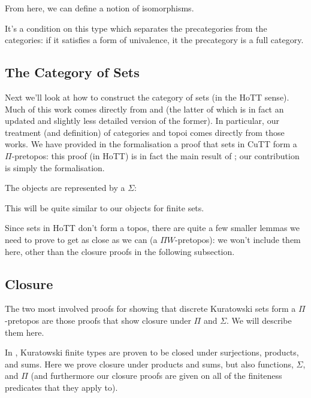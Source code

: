 From here, we can define a notion of isomorphisms.
\begin{agdalisting}
\end{agdalisting}
It's a condition on this type which separates the precategories from the
categories: if it satisfies a form of univalence, it the precategory is a full
category.
\begin{agdalisting}
\end{agdalisting}
\subsection{The Category of Sets}
Next we'll look at how to construct the category of sets (in the HoTT sense).
Much of this work comes directly from \citet{rijkeSetsHomotopyType2015} and
\citet[section 10]{hottbook} (the latter of which is in fact an updated and
slightly less detailed version of the former).
In particular, our treatment (and definition) of categories and topoi comes
directly from those works.
We have provided in the formalisation a proof that sets in CuTT form a
\(\Pi\)-pretopos: this proof (in HoTT) is in fact the main result of
\citet{rijkeSetsHomotopyType2015}; our contribution is simply the formalisation.

The objects are represented by a \(\Sigma\):
\begin{agdalisting*}
\end{agdalisting*}
This will be quite similar to our objects for finite sets.

Since sets in HoTT don't form a topos, there are quite a few smaller lemmas we
need to prove to get as close as we can (a \(\Pi W\)-pretopos): we won't include
them here, other than the closure proofs in the following subsection.
\subsection{Closure}
The two most involved proofs for showing that discrete Kuratowski sets form a
\(\Pi\)-pretopos are those proofs that show closure under \(\Pi\) and
\(\Sigma\).
We will describe them here.

In \cite[Theorem 4.21]{fruminFiniteSetsHomotopy2018}, Kuratowski finite types
are proven to be closed under surjections, products, and sums.
Here we prove closure under products and sums, but also functions, \(\Sigma\),
and \(\Pi\) (and furthermore our closure proofs are given on all of the
finiteness predicates that they apply to).

